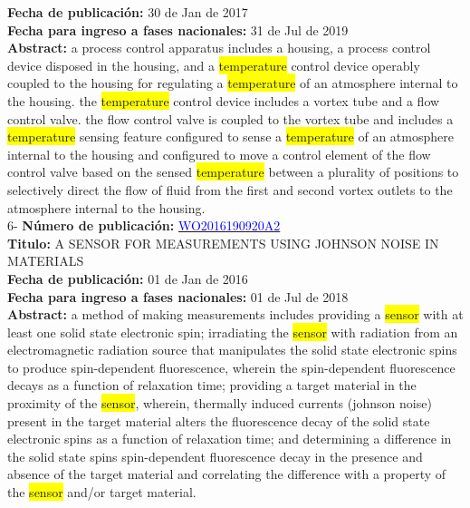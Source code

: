 \textbf{Fecha de publicación:} 30 de Jan de 2017\\ 
\textbf{Fecha para ingreso a fases nacionales:} 31 de Jul de 2019\\ 
\textbf{Abstract:} a process control apparatus includes a housing, a process control device disposed in the housing, and a \colorbox{yellow}{temperature} control device operably coupled to the housing for regulating a \colorbox{yellow}{temperature} of an atmosphere internal to the housing. the \colorbox{yellow}{temperature} control device includes a vortex tube and a flow control valve. the flow control valve is coupled to the vortex tube and includes a \colorbox{yellow}{temperature} sensing feature configured to sense a \colorbox{yellow}{temperature} of an atmosphere internal to the housing and configured to move a control element of the flow control valve based on the sensed \colorbox{yellow}{temperature} between a plurality of positions to selectively direct the flow of fluid from the first and second vortex outlets to the atmosphere internal to the housing.\\ 
 

 \vspace{1cm}6- \textbf{Número de publicación:} \href{https://worldwide.espacenet.com/publicationDetails/biblio?DB=EPODOC&II=0&ND=3&adjacent=true&locale=en_EP&FT=D&date=20160331&CC=WO&NR=2016190920A2&KC=A2#}{\textcolor{blue}{WO2016190920A2}}\\ 
\textbf{Titulo:} A SENSOR FOR MEASUREMENTS USING JOHNSON NOISE IN MATERIALS\\ 
 
\textbf{Fecha de publicación:} 01 de Jan de 2016\\ 
\textbf{Fecha para ingreso a fases nacionales:} 01 de Jul de 2018\\ 
\textbf{Abstract:} a method of making measurements includes providing a \colorbox{yellow}{sensor} with at least one solid state electronic spin; irradiating the \colorbox{yellow}{sensor} with radiation from an electromagnetic radiation source that manipulates the solid state electronic spins to produce spin-dependent fluorescence, wherein the spin-dependent fluorescence decays as a function of relaxation time; providing a target material in the proximity of the \colorbox{yellow}{sensor}, wherein, thermally induced currents (johnson noise) present in the target material alters the fluorescence decay of the solid state electronic spins as a function of relaxation time; and determining a difference in the solid state spins spin-dependent fluorescence decay in the presence and absence of the target material and correlating the difference with a property of the \colorbox{yellow}{sensor} and/or target material.\\ 
 

